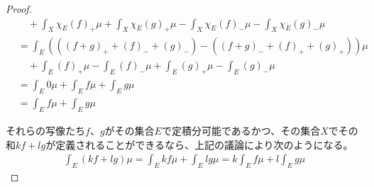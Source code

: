 \documentclass[dvipdfmx]{jsarticle}
\begin{document}
\begin{proof}
\begin{align*}
&\quad + \int_{X} {\chi_{E}(f)_{+}\mu} + \int_{X} {\chi_{E}(g)_{+}\mu} - \int_{X} {\chi_{E}(f)_{-}\mu} - \int_{X} {\chi_{E}(g)_{-}\mu}\\
&= \int_{E} \left( \left( (f + g)_{+} + (f)_{-} + (g)_{-} \right) - \left( (f + g)_{-} + (f)_{+} + (g)_{+} \right) \right)\mu \\
&\quad + \int_{E} {(f)_{+}\mu} - \int_{E} {(f)_{-}\mu} + \int_{E} {(g)_{+}\mu} - \int_{E} {(g)_{-}\mu}\\
&= \int_{E} {0\mu} + \int_{E} {f\mu} + \int_{E} {g\mu}\\
&= \int_{E} {f\mu} + \int_{E} {g\mu}
\end{align*}\par
それらの写像たち$f$、$g$がその集合$E$で定積分可能であるかつ、その集合$X$でその和$kf + lg$が定義されることができるなら、上記の議論により次のようになる。
\begin{align*}
\int_{E} {(kf + lg)\mu} = \int_{E} {kf\mu} + \int_{E} {lg\mu} = k\int_{E} {f\mu} + l\int_{E} {g\mu}
\end{align*}
\end{proof}
\end{document}
